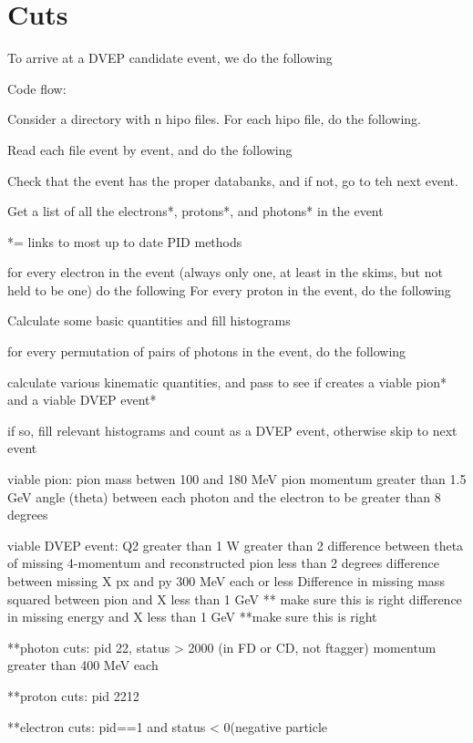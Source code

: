 \section{Cuts}

To arrive at a DVEP candidate event, we do the following


Code flow:

Consider a directory with n hipo files. For each hipo file, do the following.

Read each file event by event, and do the following

Check that the event has the proper databanks, and if not, go to teh next event.

Get a list of all the electrons*, protons*, and photons* in the event

*= links to most up to date PID methods

for every electron in the event (always only one, at least in the skims, but not held to be one) do the following
For every proton in the event, do the following

Calculate some basic quantities and fill histograms

for every permutation of pairs of photons in the event, do the following

calculate various kinematic quantities, and pass to see if creates a viable pion* and a viable DVEP event*

if so, fill relevant histograms and count as a DVEP event, otherwise skip to next event

viable pion: 
pion mass betwen 100 and 180 MeV
pion momentum greater than 1.5 GeV
angle (theta) between each photon and the electron to be greater than 8 degrees

viable DVEP event:
Q2 greater than 1
W greater than 2
difference between theta of missing 4-momentum and reconstructed pion less than 2 degrees
difference between missing X px and py 300 MeV each or less
Difference in missing mass squared between pion and X less than 1 GeV ** make sure this is right
difference in missing energy and X less than 1 GeV **make sure this is right

**photon cuts:
pid 22, status > 2000 (in FD or CD, not ftagger)
momentum greater than 400 MeV each

**proton cuts: pid 2212

**electron cuts: pid==1 and status < 0(negative particle